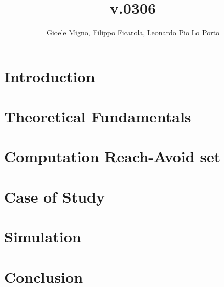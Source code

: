 \documentclass[conference]{IEEEtran}
\begin{document}
    
    \title{\LARGE v.0306}
    \author{Gioele Migno, Filippo Ficarola, Leonardo Pio Lo Porto}
    \maketitle
    
    
    
    \section{Introduction}
        
    
    \section{Theoretical Fundamentals}
        
    
    \section{Computation Reach-Avoid set}
        

    \section{Case of Study}
        

    \section{Simulation}
        
        
    \section{Conclusion}
        

    \appendix
        

    
\end{document}
